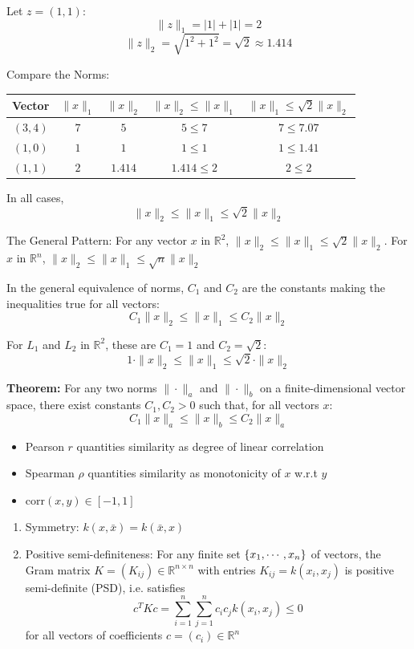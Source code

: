 \documentclass{article}
\begin{document}
Let $z = (1, 1)$:
\[
\|z\|_1 = |1| + |1| = 2
\]
\[
\|z\|_2 = \sqrt{1^2 + 1^2} = \sqrt{2} \approx 1.414
\]

Compare the Norms:
\begin{center}
\begin{tabular}{|c|c|c|c|c|}
\hline
\textbf{Vector} & $\|x\|_1$ & $\|x\|_2$ & $\|x\|_2 \leq \|x\|_1$ & $\|x\|_1 \leq \sqrt{2}\|x\|_2$ \\
\hline
$(3,4)$   & $7$   & $5$       & $5 \leq 7$     & $7 \leq 7.07$ \\
$(1,0)$   & $1$   & $1$       & $1 \leq 1$     & $1 \leq 1.41$ \\
$(1,1)$   & $2$   & $1.414$   & $1.414 \leq 2$ & $2 \leq 2$ \\
\hline
\end{tabular}
\end{center}

In all cases,
\[
\|x\|_2 \leq \|x\|_1 \leq \sqrt{2}\|x\|_2
\]

The General Pattern: For any vector $x$ in $\mathbb{R}^2$,
$
\|x\|_2 \leq \|x\|_1 \leq \sqrt{2}\|x\|_2
$.
For $x$ in $\mathbb{R}^n$,
$
\|x\|_2 \leq \|x\|_1 \leq \sqrt{n}\|x\|_2
$

In the general equivalence of norms, $C_1$ and $C_2$ are the constants making the inequalities true for all vectors:
\[
C_1 \|x\|_2 \leq \|x\|_1 \leq C_2\|x\|_2
\]

For $L_1$ and $L_2$ in $\mathbb{R}^2$, these are $C_1 = 1$ and $C_2 = \sqrt{2}$:
\[
1 \cdot \|x\|_2 \leq \|x\|_1 \leq \sqrt{2}\cdot\|x\|_2
\]


\textbf{Theorem: }For any two norms $\|\cdot\|_a$ and $\|\cdot\|_b$ on a finite-dimensional vector space, there exist constants $C_1, C_2 > 0$ such that, for all vectors $x$:
\[
C_1 \|x\|_a \leq \|x\|_b \leq C_2 \|x\|_a
\]


\begin{itemize}
    \item Pearson $r$ quantities similarity as degree of linear correlation
    \item Spearman $\rho$ quantities similarity as monotonicity of $x$ w.r.t $y$
    \item $\text{corr}(x,y) \in [-1,1]$
\end{itemize}

\begin{enumerate}
    \item Symmetry: $k(x, \bar{x}) = k(\bar{x}, x)$
    \item Positive semi-definiteness: For any finite set $\{x_1, \cdots, x_n\}$ of vectors, the Gram matrix $K=(K_{ij}) \in \mathbb{R}^{n \times n}$ with entries $K_{ij}=k(x_i, x_j)$ is positive semi-definite (PSD), i.e. satisfies
    \[
    c^T Kc = \sum_{i=1}^{n} \sum_{j=1}^{n} c_i c_j k(x_i, x_j) \leq 0
    \]
    for all vectors of coefficients $c = (c_i) \in \mathbb{R}^n$
\end{enumerate}
\end{document}
